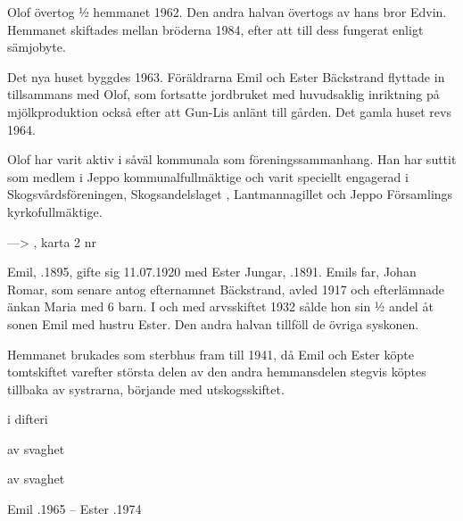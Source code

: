 
Olof övertog  ½ hemmanet 1962. Den andra  halvan övertogs av hans bror Edvin. Hemmanet skiftades mellan bröderna 1984, efter att till dess fungerat enligt sämjobyte.

Det nya huset byggdes 1963. Föräldrarna Emil och Ester Bäckstrand flyttade in tillsammans med Olof, som fortsatte jordbruket med huvudsaklig inriktning på mjölkproduktion också efter att Gun-Lis anlänt till gården. Det gamla huset revs 1964.

Olof har varit aktiv i såväl kommunala som föreningssammanhang. Han har suttit som medlem i Jeppo kommunalfullmäktige och varit speciellt engagerad i Skogsvårdsföreningen, Skogsandelslaget , Lantmannagillet och Jeppo Församlings kyrkofullmäktige.

---> , karta 2 nr 


Emil, .1895, gifte sig 11.07.1920 med Ester Jungar, .1891. Emils far, Johan Romar, som senare antog efternamnet Bäckstrand, avled 1917 och efterlämnade änkan Maria med 6 barn. I och med arvsskiftet 1932 sålde hon sin ½ andel åt sonen Emil  med hustru Ester. Den andra halvan tillföll de övriga syskonen.

Hemmanet brukades som sterbhus fram till 1941, då Emil och Ester köpte tomtskiftet varefter största delen av den andra hemmansdelen stegvis köptes tillbaka av systrarna, börjande med utskogsskiftet.
\begin{jhchildren}
  \item {}
  \item {} i difteri
  \item {}
  \item {}
  \item {} av svaghet
  \item {} av svaghet
\end{jhchildren}

Emil .1965  --  Ester .1974


